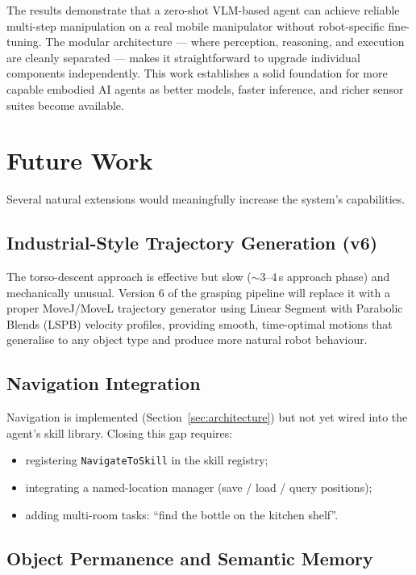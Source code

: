 The results demonstrate that a zero-shot VLM-based agent can achieve reliable multi-step
manipulation on a real mobile manipulator without robot-specific fine-tuning.
The modular architecture --- where perception, reasoning, and execution are cleanly
separated --- makes it straightforward to upgrade individual components independently.
This work establishes a solid foundation for more capable embodied AI agents as better
models, faster inference, and richer sensor suites become available.

\section{Future Work}
\label{sec:future_work}

Several natural extensions would meaningfully increase the system's capabilities.

\subsection{Industrial-Style Trajectory Generation (v6)}

The torso-descent approach is effective but slow ($\sim$3--4\,s approach phase) and
mechanically unusual.
Version 6 of the grasping pipeline will replace it with a proper MoveJ/MoveL trajectory
generator using Linear Segment with Parabolic Blends (LSPB) velocity profiles, providing
smooth, time-optimal motions that generalise to any object type and produce more natural
robot behaviour.

\subsection{Navigation Integration}

Navigation is implemented (Section~\ref{sec:architecture}) but not yet wired into the
agent's skill library.
Closing this gap requires:
\begin{itemize}[noitemsep]
  \item registering \texttt{NavigateToSkill} in the skill registry;
  \item integrating a named-location manager (save / load / query positions);
  \item adding multi-room tasks: ``find the bottle on the kitchen shelf''.
\end{itemize}

\subsection{Object Permanence and Semantic Memory}

